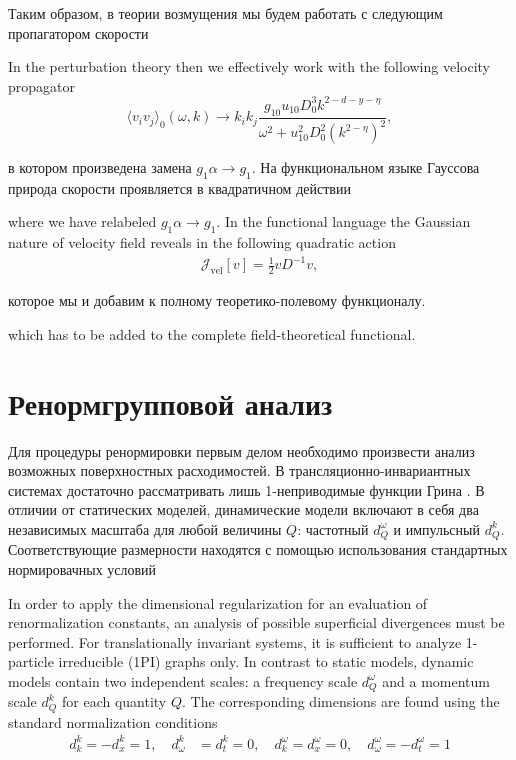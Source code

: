 \documentclass[12pt]{article}
\def\J{\mathcal{J}}
\begin{document}
Таким образом, в теории возмущения мы будем работать с следующим пропагатором скорости

In the perturbation theory then we effectively work with the following velocity propagator
\begin{equation}
  \langle v_i v_j \rangle_0 (\omega,k) \rightarrow
  k_i k_j
  \frac{g_{10} u_{10} D_0^3 k^{2-d-y-\eta}}{\omega^2 + u_{10}^2 D_0^2 (k^{2-\eta})^2},
  \label{eq:potential_v}
\end{equation}

в котором произведена замена $g_1\alpha \rightarrow g_1$.
На функциональном языке Гауссова природа скорости проявляется в квадратичном действии

where we have relabeled $g_1\alpha \rightarrow g_1$.
In the functional language the Gaussian nature of velocity field reveals in
the following quadratic action
\begin{align}
  \J_{\text{vel}}[v] = \frac{1}{2}
  v D^{-1} v,
  \label{eq:act_vel}
\end{align}

которое мы и добавим к полному теоретико-полевому функционалу.

 which has to be added to the complete field-theoretical functional.
\section{Ренормгрупповой анализ \label{sec:renorm}}

Для процедуры ренормировки первым делом необходимо произвести анализ возможных поверхностных расходимостей. 
В трансляционно-инвариантных системах достаточно рассматривать лишь 1-неприводимые функции Грина \cite{Zinn,Amit}.
В отличии от статических моделей, динамические модели  \cite{Vasiliev,Tauber2014} включают в себя два независимых масштаба для любой величины $Q$: частотный $d^\omega_Q $ и импульсный $d^k_Q$.
Соответствующие размерности находятся с помощью использования стандартных нормировачных условий

In order to apply the dimensional regularization for an evaluation %
of renormalization constants, an analysis of possible superficial
divergences must be performed.
For translationally invariant
systems, it  is sufficient  \cite{Zinn,Amit} to analyze 1-particle irreducible (1PI)
graphs only.
In contrast to static models, dynamic models  \cite{Vasiliev,Tauber2014} 
contain two independent scales: a frequency scale 
 $d^\omega_Q $ and a momentum scale $d^k_Q$ for each quantity $Q$.
The corresponding dimensions are found using the 
standard normalization conditions 
\begin{align}
  d_k^k = - d^k_x =1,\quad
  d^k_\omega & = d_t^k = 0, \quad 
  d_k^\omega = d^\omega_x = 0,\quad
  d^\omega_\omega = -d_t^\omega = 1
  \label{eq:def_normal}
\end{align}
\end{document}
